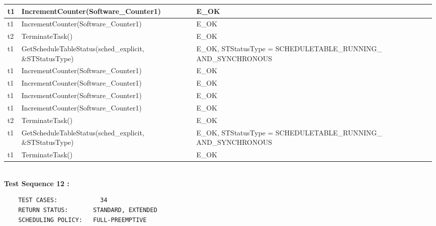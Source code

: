 \documentclass[10pt]{article}
\newlength{\Li}\settowidth{\Li}{Running}
\newlength{\Lii}\setlength{\Lii}{7cm}
\newlength{\Liiii}\setlength{\Liiii}{0.9cm}
\newlength{\Liii}\setlength{\Liii}{\textwidth} \addtolength{\Liii}{-\Li} \addtolength{\Liii}{-\Lii} \addtolength{\Liii}{-\Liiii}
\begin{document}
\begin{supertabular}{|p{\Li}|p{\Lii}|p{\Liii}|p{\Liiii}|}
	t1		& IncrementCounter(Software\_Counter1)						& E\_OK																	& \\ \hline
	t1		& IncrementCounter(Software\_Counter1)						& E\_OK																	& \\ \hline
	t2		& TerminateTask()											& E\_OK																	& \\ \hline
	t1		& GetScheduleTableStatus(sched\_explicit, \&STStatusType)			& E\_OK, STStatusType = SCHEDULETABLE\_RUNNING\_ AND\_SYNCHRONOUS		& \\ \hline
	t1		& IncrementCounter(Software\_Counter1)						& E\_OK																	& \\ \hline
	t1		& IncrementCounter(Software\_Counter1)						& E\_OK																	& \\ \hline
	t1		& IncrementCounter(Software\_Counter1)						& E\_OK																	& \\ \hline
	t1		& IncrementCounter(Software\_Counter1)						& E\_OK																	& \\ \hline
	t2		& TerminateTask()											& E\_OK																	& \\ \hline
	t1		& GetScheduleTableStatus(sched\_explicit, \&STStatusType)			& E\_OK, STStatusType = SCHEDULETABLE\_RUNNING\_ AND\_SYNCHRONOUS		& \\ \hline
	t1		& TerminateTask()											& E\_OK																	& \\ \hline
	\end{supertabular}\\

	\textbf{Test Sequence 12 :}
	\begin{lstlisting}
	TEST CASES:		       34
	RETURN STATUS:	  	 STANDARD, EXTENDED
	SCHEDULING POLICY:   FULL-PREEMPTIVE
	\end{lstlisting}
	
	
\end{document}
